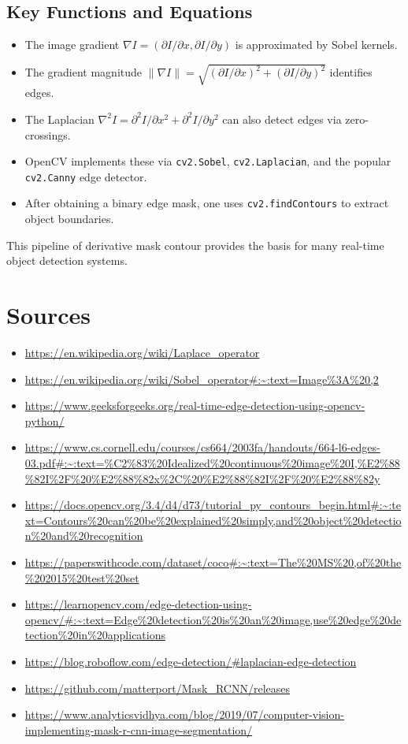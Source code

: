 \documentclass[12pt]{article}
\begin{document}
\subsection*{Key Functions and Equations}
\begin{itemize}
\item The image gradient $\nabla I = (\partial I/\partial x, \partial I/\partial y)$ is approximated by Sobel kernels.
\item The gradient magnitude $\|\nabla I\| = \sqrt{(\partial I/\partial x)^2 + (\partial I/\partial y)^2}$ identifies edges.
\item The Laplacian $\nabla^2 I = \partial^2 I/\partial x^2 + \partial^2 I/\partial y^2$ can also detect edges via zero-crossings.
\item OpenCV implements these via \texttt{cv2.Sobel}, \texttt{cv2.Laplacian}, and the popular \texttt{cv2.Canny} edge detector.
\item After obtaining a binary edge mask, one uses \texttt{cv2.findContours} to extract object boundaries.
\end{itemize}

This pipeline of derivative  mask  contour provides the basis for many real-time object detection systems.

\newpage
\section{Sources}
\begin{itemize}

\item \url{https://en.wikipedia.org/wiki/Laplace_operator}
\item \url{https://en.wikipedia.org/wiki/Sobel_operator#:~:text=Image%3A%20,2}
\item \url{https://www.geeksforgeeks.org/real-time-edge-detection-using-opencv-python/}
\item \url{https://www.cs.cornell.edu/courses/cs664/2003fa/handouts/664-l6-edges-03.pdf#:~:text=%C2%83%20Idealized%20continuous%20image%20I,%E2%88%82I%2F%20%E2%88%82x%2C%20%E2%88%82I%2F%20%E2%88%82y}
\item \url{https://docs.opencv.org/3.4/d4/d73/tutorial_py_contours_begin.html#:~:text=Contours%20can%20be%20explained%20simply,and%20object%20detection%20and%20recognition}
\item \url{https://paperswithcode.com/dataset/coco#:~:text=The%20MS%20,of%20the%202015%20test%20set}
\item \url{https://learnopencv.com/edge-detection-using-opencv/#:~:text=Edge%20detection%20is%20an%20image,use%20edge%20detection%20in%20applications}
\item \url{https://blog.roboflow.com/edge-detection/#laplacian-edge-detection}
\item \url{https://github.com/matterport/Mask_RCNN/releases}
\item \url{https://www.analyticsvidhya.com/blog/2019/07/computer-vision-implementing-mask-r-cnn-image-segmentation/}
\end{itemize}
\end{document}
